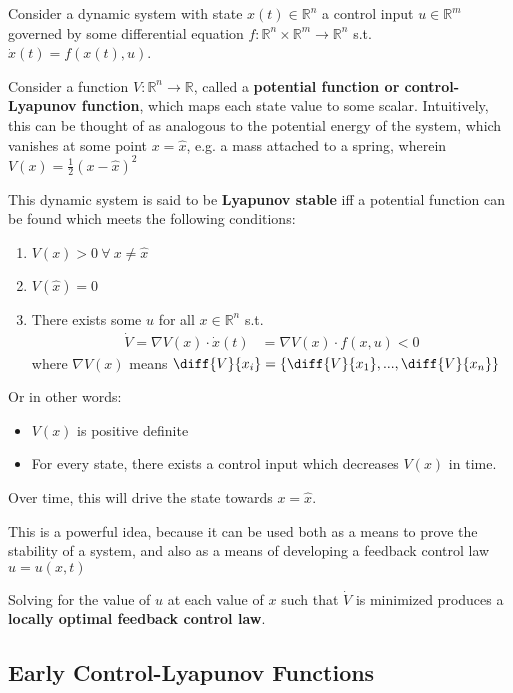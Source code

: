 Consider a dynamic system with state $x(t) \in \mathbb{R}^n$ a control input $u \in \mathbb{R}^m$ governed by some differential equation $f : \mathbb{R}^n \times \mathbb{R}^m \to \mathbb{R}^n$ s.t. $\dot{x}(t) = f(x(t), u)$. 

Consider a function $V: \mathbb{R}^n \to \mathbb{R}$, called a \textbf{potential function or control-Lyapunov function}, which maps each state value to some scalar. Intuitively, this can be thought of as analogous to the potential energy of the system, which vanishes at some point $x = \hat{x}$, e.g. a mass attached to a spring, wherein $V(x) = \frac{1}{2}(x-\hat{x})^2$

This dynamic system is said to be \textbf{Lyapunov stable} iff a potential function can be found which meets the following conditions:
\begin{enumerate}
    \item $V(x) > 0\  \forall \ x \neq \hat{x}$
    \item $V(\hat{x}) = 0$
    \item There exists some $u$ for all $x \in \mathbb{R}^n$ s.t.
    \begin{align*}
    \dot{V}= \nabla V(x) \cdot \dot{x}(t) &= \nabla V(x) \cdot f(x, u) < 0
    \end{align*}
    where $\nabla V(x)$ means $\diff{V}{{x_i}} = \left\{\diff{V}{{x_1}}, ..., \diff{V}{{x_n}}  \right\}$
\end{enumerate}
Or in other words:
\begin{itemize}
    \item $V(x)$ is positive definite
    \item For every state, there exists a control input which decreases $V(x)$ in time.
\end{itemize}

Over time, this will drive the state towards $x = \hat{x}$.

This is a powerful idea, because it can be used both as a means to prove the stability of a system, and also as a means of developing a feedback control law $u = u(x, t)$

Solving for the value of $u$ at each value of $x$ such that $\dot{V}$ is minimized produces a \textbf{locally optimal feedback control law}.

\subsection{Early Control-Lyapunov Functions}

